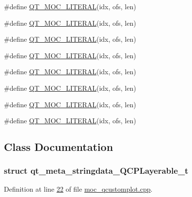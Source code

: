 \begin{DoxyCompactItemize}
\item 
\#define \hyperlink{a00067_a75bb9482d242cde0a06c9dbdc6b83abe}{Q\+T\+\_\+\+M\+O\+C\+\_\+\+L\+I\+T\+E\+R\+A\+L}(idx, ofs, len)
\item 
\#define \hyperlink{a00067_a75bb9482d242cde0a06c9dbdc6b83abe}{Q\+T\+\_\+\+M\+O\+C\+\_\+\+L\+I\+T\+E\+R\+A\+L}(idx, ofs, len)
\item 
\#define \hyperlink{a00067_a75bb9482d242cde0a06c9dbdc6b83abe}{Q\+T\+\_\+\+M\+O\+C\+\_\+\+L\+I\+T\+E\+R\+A\+L}(idx, ofs, len)
\item 
\#define \hyperlink{a00067_a75bb9482d242cde0a06c9dbdc6b83abe}{Q\+T\+\_\+\+M\+O\+C\+\_\+\+L\+I\+T\+E\+R\+A\+L}(idx, ofs, len)
\item 
\#define \hyperlink{a00067_a75bb9482d242cde0a06c9dbdc6b83abe}{Q\+T\+\_\+\+M\+O\+C\+\_\+\+L\+I\+T\+E\+R\+A\+L}(idx, ofs, len)
\item 
\#define \hyperlink{a00067_a75bb9482d242cde0a06c9dbdc6b83abe}{Q\+T\+\_\+\+M\+O\+C\+\_\+\+L\+I\+T\+E\+R\+A\+L}(idx, ofs, len)
\item 
\#define \hyperlink{a00067_a75bb9482d242cde0a06c9dbdc6b83abe}{Q\+T\+\_\+\+M\+O\+C\+\_\+\+L\+I\+T\+E\+R\+A\+L}(idx, ofs, len)
\item 
\#define \hyperlink{a00067_a75bb9482d242cde0a06c9dbdc6b83abe}{Q\+T\+\_\+\+M\+O\+C\+\_\+\+L\+I\+T\+E\+R\+A\+L}(idx, ofs, len)
\end{DoxyCompactItemize}


\subsection{Class Documentation}
\label{de/dd2/a00207}
\hypertarget{a00067_de/dd2/a00207}{}
\subsubsection{struct qt\+\_\+meta\+\_\+stringdata\+\_\+\+Q\+C\+P\+Layerable\+\_\+t}


Definition at line \hyperlink{a00067_source_l00022}{22} of file \hyperlink{a00067_source}{moc\+\_\+qcustomplot.\+cpp}.



